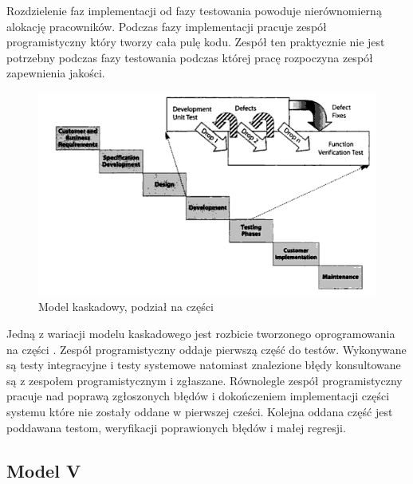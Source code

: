 Rozdzielenie faz implementacji od fazy testowania powoduje nierównomierną alokację pracowników. Podczas fazy implementacji pracuje zespół programistyczny który tworzy cała pulę kodu. Zespół ten praktycznie nie jest potrzebny podczas fazy testowania podczas której pracę rozpoczyna zespół zapewnienia jakości.
\begin{figure}[h]
\centerline{\includegraphics[scale=0.5]{img/water-wheel.png}}
\caption{Model kaskadowy, podział na części}
\label{fig:kaskadowyCzesci}
\end{figure}

Jedną z wariacji modelu kaskadowego jest rozbicie tworzonego oprogramowania na części \cite{TestingMatt}. 
Zespół programistyczny oddaje pierwszą część do testów. Wykonywane są testy integracyjne i testy systemowe natomiast znalezione błędy konsultowane są z zespołem programistycznym i zgłaszane. Równolegle zespół programistyczny pracuje nad poprawą zgłoszonych błędów i dokończeniem implementacji części systemu które nie zostały oddane w pierwszej cześci. Kolejna oddana część jest poddawana testom, weryfikacji poprawionych błędów i małej regresji.

 
 
\subsection{Model V}

